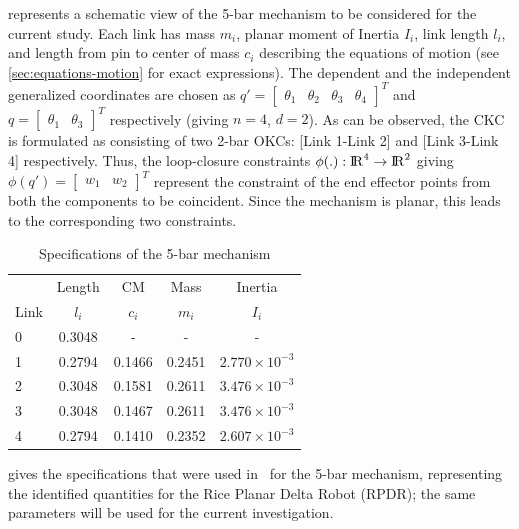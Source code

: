 \documentclass[10pt,final,journal,letterpaper,oneside,twocolumn]{IEEEtran}
\newcommand{\Real}{{\rm I\!R}}
\begin{document}
 represents a schematic view of the 5-bar mechanism
to be considered for the current study. Each link has mass $m_i$,
planar moment of Inertia $I_i$, link length $l_i$, and length from pin
to center of mass $c_i$ describing the equations of motion (see
\cref{sec:equations-motion} for exact expressions). The dependent and
the independent generalized coordinates are chosen as $q'
= \begin{bmatrix} \theta_1 & \theta_2 & \theta_3 &
  \theta_4 \end{bmatrix}^T$ and $q = \begin{bmatrix} \theta_1 &
  \theta_3 \end{bmatrix}^T$ respectively (giving $n=4$, $d=2$). As can
be observed, the CKC is formulated as consisting of two 2-bar OKCs: 
[Link 1-Link 2] and [Link 3-Link 4] respectively. Thus, the
loop-closure constraints $\phi(.): \Real^4 \to \Real^2$ giving
$\phi(q') = \begin{bmatrix} w_1 & w_2 \end{bmatrix}^T$ represent the
constraint of the end effector points from both the components to be
coincident. Since the mechanism is planar, this leads to the
corresponding two constraints.

\begin{table}[!h]
  \centering
  \caption{Specifications of the 5-bar mechanism}
  \begin{tabular}[!h]{lcccc}
    \hline
    & Length & CM & Mass & Inertia\\
    Link & $l_i$ & $c_i$ & $m_i$ & $I_i$\\
    \hline
    0 & 0.3048 & - & - & -\\
    1 & 0.2794 & 0.1466 & 0.2451 & $2.770\times 10^{-3}$\\
    2 & 0.3048 & 0.1581 & 0.2611 & $3.476\times 10^{-3}$\\
    3 & 0.3048 & 0.1467 & 0.2611 & $3.476\times 10^{-3}$\\
    4 & 0.2794 & 0.1410 & 0.2352 & $2.607\times 10^{-3}$\\
    \hline 
  \end{tabular}
  \label{tab:5barspec}
\end{table}

 gives the specifications that were used
in~\cite{ghorbel_modeling_2000} for the 5-bar mechanism, representing
the identified quantities for the Rice Planar Delta Robot (RPDR); the
same parameters will be used for the current investigation.
\end{document}
